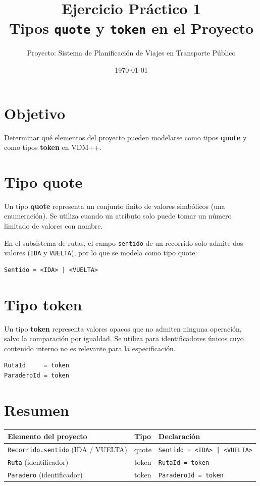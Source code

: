 \documentclass[11pt,a4paper]{article}
\title{\textbf{Ejercicio Práctico 1}\\[2mm]
\large Tipos \texttt{quote} y \texttt{token} en el Proyecto}
\author{Proyecto: Sistema de Planificación de Viajes en Transporte Público}
\date{\today}
\begin{document}
\maketitle

\section{Objetivo}

Determinar qué elementos del proyecto pueden modelarse como tipos \textbf{quote} y como tipos \textbf{token} en VDM++.

\section{Tipo quote}

Un tipo \textbf{quote} representa un conjunto finito de valores simbólicos (una enumeración). Se utiliza cuando un atributo solo puede tomar un número limitado de valores con nombre.

En el subsistema de rutas, el campo \texttt{sentido} de un recorrido solo admite dos valores (\texttt{IDA} y \texttt{VUELTA}), por lo que se modela como tipo quote:

\begin{lstlisting}
Sentido = <IDA> | <VUELTA>
\end{lstlisting}

\section{Tipo token}

Un tipo \textbf{token} representa valores opacos que no admiten ninguna operación, salvo la comparación por igualdad. Se utiliza para identificadores únicos cuyo contenido interno no es relevante para la especificación.

\begin{lstlisting}
RutaId     = token
ParaderoId = token
\end{lstlisting}

\section{Resumen}

\begin{center}
\begin{tabular}{|l|l|l|}
\hline
\textbf{Elemento del proyecto} & \textbf{Tipo} & \textbf{Declaración} \\
\hline
\texttt{Recorrido.sentido} (IDA / VUELTA) & quote & \texttt{Sentido = <IDA> | <VUELTA>} \\
\hline
\texttt{Ruta} (identificador) & token & \texttt{RutaId = token} \\
\hline
\texttt{Paradero} (identificador) & token & \texttt{ParaderoId = token} \\
\hline
\end{tabular}
\end{center}
\end{document}
